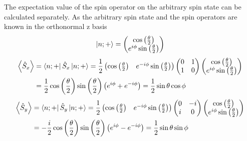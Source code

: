 \begin{sol}
The expectation value of the spin operator on the arbitrary spin state can be calculated separately. As the arbitrary spin state and the spin operators are known in the orthonormal z basis
    \begin{equation}
        \ket{n;+}=\begin{pmatrix} \cos\left( \frac{\theta}{2} \right) \\e^{i\phi}\sin\left( \frac{\theta}{2} \right)  \end{pmatrix} 
    \end{equation}
    \begin{equation}
        \begin{aligned}
            \left<\hat{S}_x \right> &= \bra{n;+}\hat{S}_x\ket{n;+}=\frac{1}{2}\begin{pmatrix} \cos\left( \frac{\theta}{2} \right)&e^{-i\phi}\sin\left( \frac{\theta}{2} \right)   \end{pmatrix} 
            \begin{pmatrix} 0&1\\1&0 \end{pmatrix}
            \begin{pmatrix} \cos\left( \frac{\theta}{2} \right)\\e^{i\phi}\sin\left( \frac{\theta}{2} \right)   \end{pmatrix}\\
            &=\frac{1}{2}\cos\left( \frac{\theta}{2} \right)\sin\left( \frac{\theta}{2} \right)\left(e^{i\phi}+e^{-i\phi}\right)=\frac{1}{2}\sin\theta\cos\phi  
        \end{aligned}
    \end{equation}
    \begin{equation}
        \begin{aligned}
            \left<\hat{S}_y \right> &= \bra{n;+}\hat{S}_y\ket{n;+}=\frac{1}{2}\begin{pmatrix} \cos\left( \frac{\theta}{2} \right) & e^{-i\phi}\sin\left( \frac{\theta}{2} \right)  \end{pmatrix}
            \begin{pmatrix} 0&-i\\i&0 \end{pmatrix}\begin{pmatrix} \cos\left( \frac{\theta}{2} \right) \\ e^{i\phi}\sin\left( \frac{\theta}{2} \right)  \end{pmatrix}\\
            &=-\frac{i}{2}\cos\left( \frac{\theta}{2} \right)\sin\left( \frac{\theta}{2} \right)\left( e^{i\phi}-e^{-i\phi} \right)=\frac{1}{2}\sin\theta\sin\phi

\end{aligned}
\end{equation}
\end{sol}
